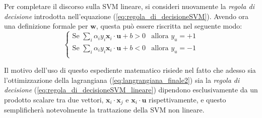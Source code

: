 Per completare il discorso sulla SVM lineare, si consideri nuovamente la \emph{regola di decisione} introdotta nell'equazione (\ref{eq:regola_di_decisioneSVM}). Avendo ora una definizione formale per $\mathbf{w}$, questa può essere riscritta nel seguente modo:
\begin{equation}
\label{eq:regola_di_decisioneSVM_lineare}
\left\{
		\begin{array}{ll}
			\text{Se } \sum_i\alpha_i y_i\mathbf{x}_i\cdot\mathbf{u}+b>0 & \mbox{allora } y_u=+1 \\
			\text{Se } \sum_i\alpha_i y_i\mathbf{x}_i\cdot\mathbf{u}+b<0 & \mbox{allora } y_u=-1 \\
		\end{array}
	\right.
\end{equation}

Il motivo dell'uso di questo espediente matematico risiede nel fatto che adesso sia l'ottimizzazione della lagrangiana (\ref{eq:langrangiana_finale2}) sia la \emph{regola di decisione} (\ref{eq:regola_di_decisioneSVM_lineare}) dipendono esclusivamente da un prodotto scalare tra due vettori, $\mathbf{x}_i\cdot\mathbf{x}_j$ e $\mathbf{x}_i\cdot\mathbf{u}$ rispettivamente, e questo semplificherà notevolmente la trattazione della SVM non lineare. 

